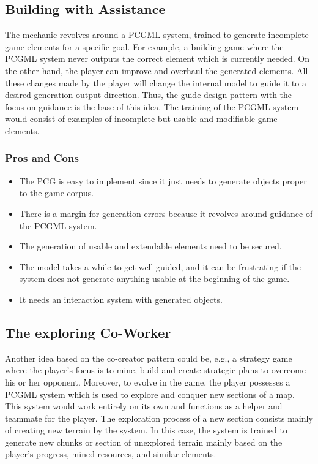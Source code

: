 \documentclass[MGS,Master,english]{twbook}%
\begin{document}
\subsection{Building with Assistance} \label{idea::buildingWithAssistance}
The mechanic revolves around a \ac{PCGML} system, trained to generate incomplete game elements for a specific goal. For example, a building game where the \ac{PCGML} system never outputs the correct element which is currently needed. On the other hand, the player can improve and overhaul the generated elements. All these changes made by the player will change the internal model to guide it to a desired generation output direction.  Thus, the guide design pattern with the focus on guidance is the base of this idea. The training of the \ac{PCGML} system would consist of examples of incomplete but usable and modifiable game elements.

\subsubsection{Pros and Cons}
\begin{itemize}
	\item The \ac{PCG} is easy to implement since it just needs to generate objects proper to the game corpus.
	\item There is a margin for generation errors because it revolves around guidance of the \ac{PCGML} system.
	\item The generation of usable and extendable elements need to be secured.
	\item The model takes a while to get well guided, and it can be frustrating if the system does not generate anything usable at the beginning of the game.
	\item It needs an interaction system with generated objects.
\end{itemize}


\subsection{The exploring Co-Worker} \label{idea::exploringCoWorker}
Another idea based on the co-creator pattern could be, e.g., a strategy game where the player’s focus is to mine, build and create strategic plans to overcome his or her opponent. Moreover, to evolve in the game, the player possesses a \ac{PCGML} system which is used to explore and conquer new sections of a map. This system would work entirely on its own and functions as a helper and teammate for the player. The exploration process of a new section consists mainly of creating new terrain by the system. In this case, the system is trained to generate new chunks or section of unexplored terrain mainly based on the player’s progress, mined resources, and similar elements.
\end{document}
